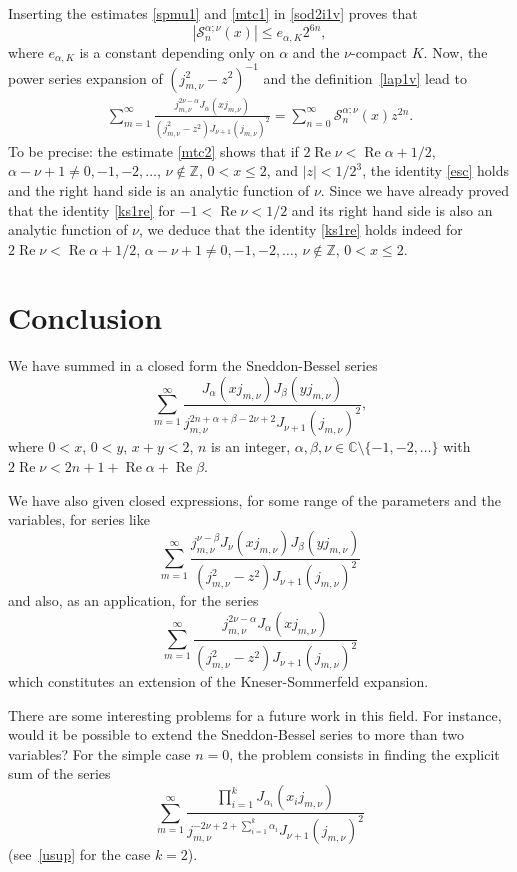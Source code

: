 \documentclass[10pt,leqno,a4paper]{article}
\theoremstyle{plain}
\newcommand{\Ss}{\mathcal{S}}
\newcommand{\ZZ}{\mathbb{Z}}
\newcommand{\CC}{\mathbb{C}}
\renewcommand{\Re}{\operatorname{Re}}
\numberwithin{equation}{section}
\begin{document}
Inserting the estimates \eqref{spmu1} and \eqref{mtc1} in \eqref{sod2i1v} proves that
\begin{equation}
\label{mtc2}
   | \Ss^{\alpha;\nu}_{n}(x) | \leq e_{\alpha,K} 2^{6n},
\end{equation}
where $e_{\alpha,K}$ is a constant depending only on $\alpha$ and the $\nu$-compact $K$. Now, the power series expansion of $(j_{m,\nu}^{2}-z^2)^{-1}$ and the definition~\eqref{lap1v} lead to
\begin{align}
\label{esc}
   \sum_{m=1}^\infty
   \frac{j_{m,\nu}^{2\nu-\alpha} J_\alpha(x j_{m,\nu})}{(j_{m,\nu}^{2}-z^2) J_{\nu+1}(j_{m,\nu})^2}
   = \sum_{n=0}^\infty \Ss_n^{\alpha;\nu}(x) z^{2n}.
\end{align}
To be precise: the estimate \eqref{mtc2} shows that
if $2\Re\nu < \Re\alpha + 1/2$, $\alpha-\nu+1\neq 0,-1,-2,\dots$, $\nu\notin \ZZ$, $0< x\leq 2$, and $|z| < 1/2^3$, the identity \eqref{esc} holds and the right hand side is an analytic function of $\nu$. Since we have already proved that the identity \eqref{ks1re} for $-1 < \Re \nu < 1/2$ and its right hand side is also an analytic function of $\nu$, we deduce that the identity \eqref{ks1re} holds indeed for $2\Re \nu < \Re \alpha + 1/2$, $\alpha - \nu + 1 \neq 0,-1,-2,\dots$, $\nu\notin \ZZ$, $0< x\leq 2$.

\section{Conclusion}

We have summed in a closed form the Sneddon-Bessel series
\[
   \sum_{m=1}^\infty
   \frac{J_\alpha(x j_{m,\nu})J_\beta(y j_{m,\nu})}
   {j_{m,\nu}^{2n+\alpha+\beta-2\nu+2} J_{\nu+1}(j_{m,\nu})^2},
\]
where $0<x$, $0<y$, $x+y<2$, $n$ is an integer, $\alpha,\beta,\nu\in \CC\setminus \{-1,-2,\dots \}$ with $2\Re \nu<2n+1+\Re \alpha+\Re \beta$.

We have also given closed expressions, for some range of the parameters and the variables, for series like
\[ %
  \sum_{m=1}^\infty
  \frac{j_{m,\nu}^{\nu-\beta}J_\nu(x j_{m,\nu})J_\beta(y j_{m,\nu})}
  {(j_{m,\nu}^{2}-z^2) J_{\nu+1}(j_{m,\nu})^2}
\]
and also, as an application, for the series
\[ %
  \sum_{m=1}^\infty
  \frac{j_{m,\nu}^{2\nu-\alpha} J_\alpha(x j_{m,\nu})}
  {(j_{m,\nu}^{2}-z^2) J_{\nu+1}(j_{m,\nu})^2}
\]
which constitutes an extension of the Kneser-Sommerfeld expansion.

There are some interesting problems for a future work in this field. For instance, would it be possible to extend the Sneddon-Bessel series to more than two variables? For the simple case $n=0$, the problem consists in finding the explicit sum of the series
\[
   \sum_{m=1}^\infty
   \frac{\prod_{i=1}^kJ_{\alpha_i}(x_i j_{m,\nu})}
   {j_{m,\nu}^{-2\nu+2+\sum_{i=1}^k\alpha_i} J_{\nu+1}(j_{m,\nu})^2}
\]
(see~\eqref{usup} for the case $k=2$).
\end{document}

